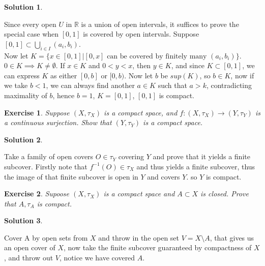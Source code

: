 \documentclass[11pt,a4paper]{article}
\newtheorem{Ex}{Exercise}
\newtheorem{Sol}{Solution}
\begin{document}
\begin{Sol}\end{Sol}

\noindent Since every open $U$ in $\mathbb{R}$ is a union of open intervals, it suffices to prove the special case when $[0,1]$ is covered by open intervals. Suppose $[0,1] \subset \bigcup_{i \in I}(a_i,b_i)$. \\ Now let $K = \{x \in [0,1]| [0,x] \text{ can be covered by finitely many }(a_i, b_i) \}$. $0 \in K \implies K \neq \emptyset$. If $x \in K$ and $0 < y < x$, then $y \in K$, and since $K \subset [0,1]$, we can express $K$ as either $[0,b]$ or $[0,b)$. Now let $b$ be $sup(K)$, so $b \in K$, now if we take $b<1$, we can always find another $a \in K$ such that $a > k$, contradicting maximality of $b$, hence $b = 1$, $K = [0,1]$, $[0,1]$ is compact.

\begin{Ex}
	Suppose $(X, \tau_X)$ is a compact space, and $f: (X, \tau_X) \rightarrow (Y,\tau_Y)$ is a continuous surjection. Show that $(Y, \tau_Y)$ is a compact space.  
\end{Ex}

\begin{Sol} \end{Sol}
Take a family  of open covers $O \in \tau_Y$ covering $Y$ and prove that it yields a finite subcover. Firstly note that $f^{-1}(O) \in \tau_X$ and thus yields a finite subcover, thus the image of that finite subcover is open in $Y$ and covers $Y$. so $Y$ is compact.

\begin{Ex}
	Supoose $(X , \tau_X)$ is a compact space and $A \subset X$ is closed. Prove that $A, \tau_A$ is compact.
\end{Ex}

\begin{Sol} \end{Sol}
Cover A by open sets from $X$ and throw in the open set $V = X \setminus A$, that gives us an open cover of $X$, now take the finite subcover guaranteed by compactness of $X$, and throw out $V$, notice we have covered $A$.
\end{document}
